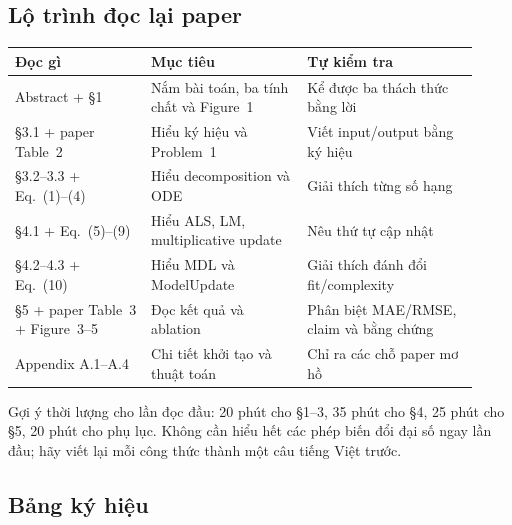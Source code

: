 \subsection*{Lộ trình đọc lại paper}

\begin{center}
\small
\begin{tabular}{@{}>{\raggedright\arraybackslash}p{0.27\linewidth}>{\raggedright\arraybackslash}p{0.31\linewidth}>{\raggedright\arraybackslash}p{0.34\linewidth}@{}}
  \toprule
  Đọc gì & Mục tiêu & Tự kiểm tra \\
  \midrule
  Abstract + §1 & Nắm bài toán, ba tính chất và Figure~1 & Kể được ba thách thức bằng lời \\
  §3.1 + paper Table~2 & Hiểu ký hiệu và Problem~1 & Viết input/output bằng ký hiệu \\
  §3.2--3.3 + Eq.~(1)--(4) & Hiểu decomposition và ODE & Giải thích từng số hạng \\
  §4.1 + Eq.~(5)--(9) & Hiểu ALS, LM, multiplicative update & Nêu thứ tự cập nhật \\
  §4.2--4.3 + Eq.~(10) & Hiểu MDL và ModelUpdate & Giải thích đánh đổi fit/complexity \\
  §5 + paper Table~3 + Figure~3--5 & Đọc kết quả và ablation & Phân biệt MAE/RMSE, claim và bằng chứng \\
  Appendix A.1--A.4 & Chi tiết khởi tạo và thuật toán & Chỉ ra các chỗ paper mơ hồ \\
  \bottomrule
\end{tabular}
\end{center}

Gợi ý thời lượng cho lần đọc đầu: 20 phút cho §1--3, 35 phút cho §4, 25 phút cho §5, 20 phút cho
phụ lục. Không cần hiểu hết các phép biến đổi đại số ngay lần đầu; hãy viết lại mỗi công thức thành
một câu tiếng Việt trước.

\subsection*{Bảng ký hiệu}

